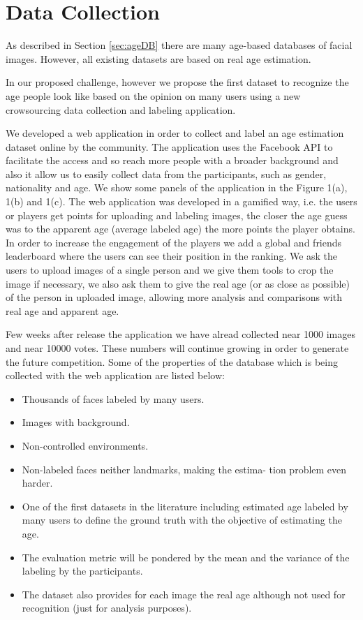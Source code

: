 \chapter{Data Collection} \label{chap:data}

As described in Section \ref{sec:ageDB} there are many age-based databases of facial images. However, all existing datasets are based on real age estimation. 


In our proposed challenge, however we propose the first dataset to recognize the age people look like based on the opinion on many users using a new crowsourcing data collection and labeling application.

We developed a web application in order to collect and label an age estimation dataset online by the community. The application uses the Facebook API to facilitate the access and so reach more people with a broader background and also it allow us to easily collect data from the participants, such as gender, nationality and age. We show some panels of the application in the Figure 1(a), 1(b) and 1(c).
The web application was developed in a gamified way, i.e. the users or players get points for uploading and labeling images, the closer the age guess was to the apparent age (average labeled age) the more points the player obtains. In order to increase the engagement of the players we add a global and friends leaderboard where the users can see their position in the ranking. We ask the users to upload images of a single person and we give them tools to crop the image if necessary, we also ask them to give the real age (or as close as possible) of the person in uploaded image, allowing more analysis and
comparisons with real age and apparent age.

Few weeks after release the application we have alread collected near 1000 images and near 10000 votes. These numbers will continue growing in order to generate the future competition. Some of the properties of the database which is being collected with the web application are listed below:

\begin{itemize}
	\item Thousands of faces labeled by many users.
	\item Images with background.
	\item Non-controlled environments.
	\item Non-labeled faces neither landmarks, making the estima-
	tion problem even harder.
	\item One of the first datasets in the literature including
	estimated age labeled by many users to define the ground truth
	with the objective of estimating the age.
	\item The evaluation metric will be pondered by the mean and
	the variance of the labeling by the participants.
	\item The dataset also provides for each image the real age
	although not used for recognition (just for analysis purposes).
\end{itemize}

